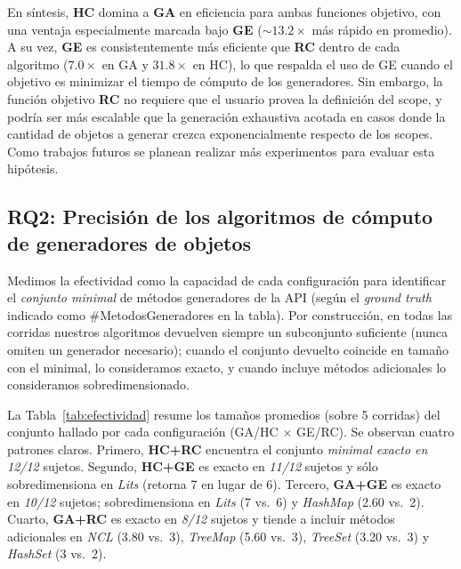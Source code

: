 

En síntesis, \textbf{HC} domina a \textbf{GA} en eficiencia para ambas funciones
objetivo, con una ventaja especialmente marcada bajo \textbf{GE}
(\(\sim 13.2\times\) más rápido en promedio). A su vez, \textbf{GE} es
consistentemente más eficiente que \textbf{RC} dentro de cada algoritmo
(\(7.0\times\) en GA y \(31.8\times\) en HC), lo que respalda el uso de GE cuando el
objetivo es minimizar el tiempo de cómputo de los generadores.
Sin embargo, la función objetivo \textbf{RC} no requiere que el usuario provea la definición del scope, y
podría ser más escalable que la generación exhaustiva acotada en casos donde
la cantidad de objetos a generar crezca exponencialmente respecto de los scopes. Como trabajos futuros se planean realizar más experimentos 
para evaluar esta hipótesis.



\subsection{RQ2: Precisión de los algoritmos de cómputo de generadores de objetos}
\label{sec:experimentalIdentificacionPrecision}

Medimos la efectividad como la capacidad de cada configuración para identificar
el \emph{conjunto minimal} de métodos generadores de la API (según el
\emph{ground truth} indicado como \#MetodosGeneradores en la tabla). Por construcción, en
todas las corridas nuestros algoritmos devuelven siempre un subconjunto
suficiente (nunca omiten un generador necesario); cuando el conjunto
devuelto coincide en tamaño con el minimal, lo consideramos exacto, y
cuando incluye métodos adicionales lo consideramos sobredimensionado.

La Tabla~\ref{tab:efectividad} resume los tamaños promedios (sobre 5
corridas) del conjunto hallado por cada configuración (GA/HC $\times$ GE/RC).
Se observan cuatro patrones claros. Primero, \textbf{HC+RC} encuentra el conjunto
\emph{minimal exacto en 12/12} sujetos. Segundo, \textbf{HC+GE} es exacto en
\emph{11/12} sujetos y sólo sobredimensiona en \emph{Lits} (retorna 7 en lugar de
6).
Tercero, \textbf{GA+GE} es exacto en \emph{10/12} sujetos; sobredimensiona en
\emph{Lits} (7 vs.\ 6) y \emph{HashMap} (2.60 vs.\ 2). Cuarto, \textbf{GA+RC} es
exacto en \emph{8/12} sujetos y tiende a incluir métodos adicionales en
\emph{NCL} (3.80 vs.\ 3), \emph{TreeMap} (5.60 vs.\ 3), \emph{TreeSet}
(3.20 vs.\ 3) y \emph{HashSet} (3 vs.\ 2).

